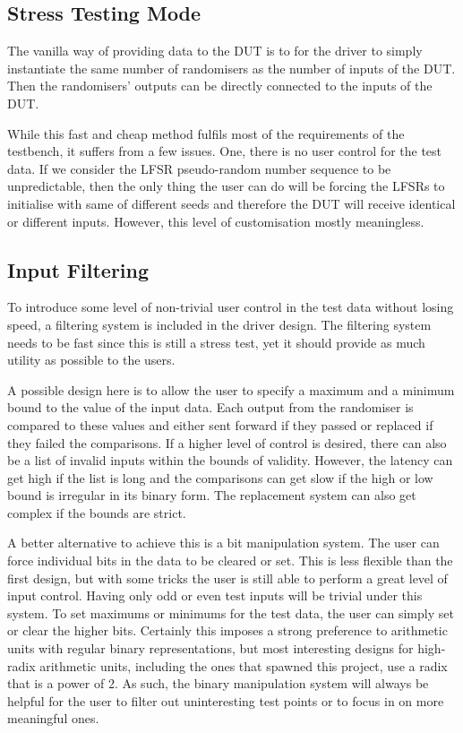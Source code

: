 \subsection{Stress Testing Mode}
The vanilla way of providing data to the DUT is to for the driver to simply instantiate the same number of randomisers as the number of inputs of the DUT.
Then the randomisers' outputs can be directly connected to the inputs of the DUT.

While this fast and cheap method fulfils most of the requirements of the testbench, it suffers from a few issues.
One, there is no user control for the test data.
If we consider the LFSR pseudo-random number sequence to be unpredictable, then the only thing the user can do will be forcing the LFSRs to initialise with same of different seeds and therefore the DUT will receive identical or different inputs.
However, this level of customisation mostly meaningless.

\subsection{Input Filtering}
To introduce some level of non-trivial user control in the test data without losing speed, a filtering system is included in the driver design.
The filtering system needs to be fast since this is still a stress test, yet it should provide as much utility as possible to the users.

A possible design here is to allow the user to specify a maximum and a minimum bound to the value of the input data.
Each output from the randomiser is compared to these values and either sent forward if they passed or replaced if they failed the comparisons.
If a higher level of control is desired, there can also be a list of invalid inputs within the bounds of validity.
However, the latency can get high if the list is long and the comparisons can get slow if the high or low bound is irregular in its binary form.
The replacement system can also get complex if the bounds are strict.

A better alternative to achieve this is a bit manipulation system.
The user can force individual bits in the data to be cleared or set.
This is less flexible than the first design, but with some tricks the user is still able to perform a great level of input control.
Having only odd or even test inputs will be trivial under this system.
To set maximums or minimums for the test data, the user can simply set or clear the higher bits.
Certainly this imposes a strong preference to arithmetic units with regular binary representations, but most interesting designs for high-radix arithmetic units, including the ones that spawned this project, use a radix that is a power of 2.
As such, the binary manipulation system will always be helpful for the user to filter out uninteresting test points or to focus in on more meaningful ones.


